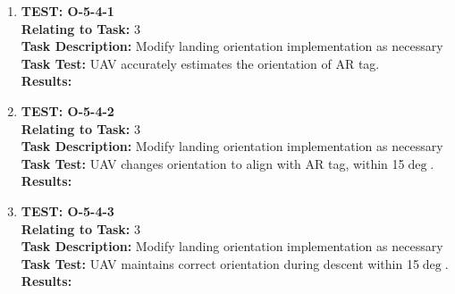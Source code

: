 \begin{enumerate}
\item \textbf{TEST: O-5-4-1}\\
\textbf{Relating to Task:} 3\\
\textbf{Task Description:} Modify landing orientation implementation as necessary\\
\textbf{Task Test:} UAV accurately estimates the orientation of AR tag.\\
\textbf{Results:} 

\item \textbf{TEST: O-5-4-2}\\
\textbf{Relating to Task:} 3\\
\textbf{Task Description:} Modify landing orientation implementation as necessary\\
\textbf{Task Test:} UAV changes orientation to align with AR tag, within 15$\deg$.\\
\textbf{Results:} 

\item \textbf{TEST: O-5-4-3}\\
\textbf{Relating to Task:} 3\\
\textbf{Task Description:} Modify landing orientation implementation as necessary\\
\textbf{Task Test:} UAV maintains correct orientation during descent within 15$\deg$.\\
\textbf{Results:}  
\end{enumerate}